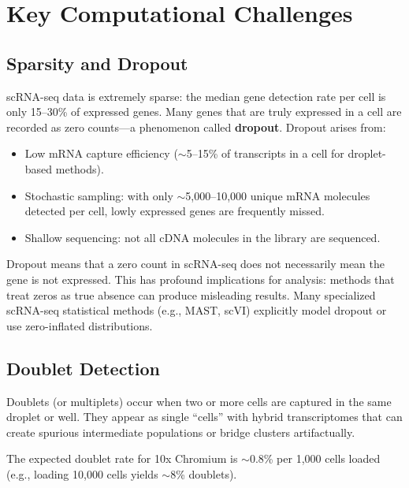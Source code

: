 \section{Key Computational Challenges}
\label{sec:scrnaseq:challenges}

\subsection{Sparsity and Dropout}

scRNA-seq data is extremely sparse: the median gene detection rate per cell is
only 15--30\% of expressed genes. Many genes that are truly expressed in a cell
are recorded as zero counts---a phenomenon called \textbf{dropout}. Dropout
arises from:

\begin{itemize}[nosep]
  \item Low mRNA capture efficiency ($\sim$5--15\% of transcripts in a cell for
    droplet-based methods).
  \item Stochastic sampling: with only $\sim$5,000--10,000 unique mRNA molecules
    detected per cell, lowly expressed genes are frequently missed.
  \item Shallow sequencing: not all cDNA molecules in the library are sequenced.
\end{itemize}

\begin{warningbox}
Dropout means that a zero count in scRNA-seq does not necessarily mean the gene
is not expressed. This has profound implications for analysis: methods that
treat zeros as true absence can produce misleading results. Many specialized
scRNA-seq statistical methods (e.g., MAST, scVI) explicitly model dropout or
use zero-inflated distributions.
\end{warningbox}

\subsection{Doublet Detection}

Doublets (or multiplets) occur when two or more cells are captured in the same
droplet or well. They appear as single ``cells'' with hybrid transcriptomes
that can create spurious intermediate populations or bridge clusters
artifactually.

The expected doublet rate for 10x Chromium is $\sim$0.8\% per 1,000 cells
loaded (e.g., loading 10,000 cells yields $\sim$8\% doublets).

